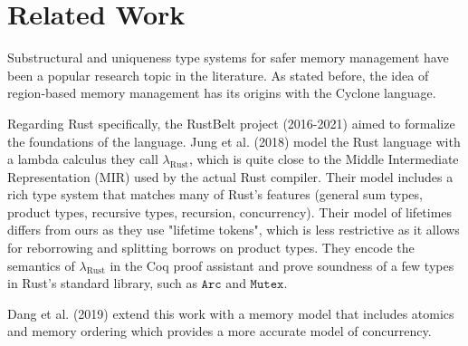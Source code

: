 \documentclass[letterpaper,11pt]{article}
\begin{document}
\section{Related Work}

Substructural and uniqueness type systems for safer memory management have been
a popular research topic in the literature. As stated before, the idea of region-based
memory management has its origins with the Cyclone language.

Regarding Rust specifically, the RustBelt project (2016-2021) aimed to
formalize the foundations of the language. Jung et al. (2018) \cite{rustbelt1} model the Rust language
with a lambda calculus they call $\lambda_{\text{Rust}}$, which is quite close to the Middle Intermediate Representation (MIR)
used by the actual Rust compiler. Their model includes a rich type system that matches many of Rust's features
(general sum types, product types, recursive types, recursion, concurrency). Their model of lifetimes differs from ours as
they use "lifetime tokens", which is less restrictive as it allows for reborrowing and splitting borrows on product types.
They encode the semantics of $\lambda_{\text{Rust}}$ in the Coq proof assistant and prove soundness of a few types in Rust's standard library,
such as $\mathtt{Arc}$ and $\mathtt{Mutex}$. 

Dang et al. (2019) \cite{rustbelt2} extend this work with a memory model that includes atomics and memory ordering which provides a more accurate model
of concurrency.




\end{document}
